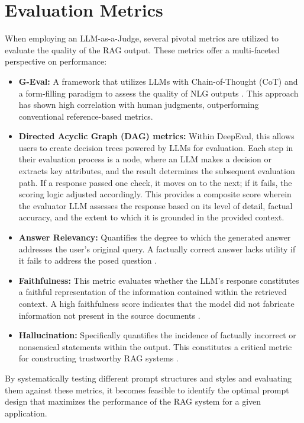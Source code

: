 \section{Evaluation Metrics}
When employing an LLM-as-a-Judge, several pivotal metrics are utilized to evaluate the quality of the RAG output. These metrics offer a multi-faceted perspective on performance:
\begin{itemize}
    \item \textbf{G-Eval:} A framework that utilizes LLMs with Chain-of-Thought (CoT) and a form-filling paradigm to assess the quality of NLG outputs \autocite{liu2023gevalnlgevaluationusing}. This approach has shown high correlation with human judgments, outperforming conventional reference-based metrics.
    \item \textbf{Directed Acyclic Graph (DAG) metrics:} Within DeepEval, this allows users to create decision trees powered by LLMs for evaluation. Each step in their evaluation process is a node, where an LLM makes a decision or extracts key attributes, and the result determines the subsequent evaluation path. If a response passed one check, it moves on to the next; if it fails, the scoring logic adjusted accordingly. This provides a composite score wherein the evaluator LLM assesses the response based on its level of detail, factual accuracy, and the extent to which it is grounded in the provided context.
    \item \textbf{Answer Relevancy:} Quantifies the degree to which the generated answer addresses the user's original query. A factually correct answer lacks utility if it fails to address the posed question \autocite{deepeval2023}.
    \item \textbf{Faithfulness:} This metric evaluates whether the LLM's response constitutes a faithful representation of the information contained within the retrieved context. A high faithfulness score indicates that the model did not fabricate information not present in the source documents \autocite{deepeval2023}.
    \item \textbf{Hallucination:} Specifically quantifies the incidence of factually incorrect or nonsensical statements within the output. This constitutes a critical metric for constructing trustworthy RAG systems \autocite{deepeval2023}.
\end{itemize}

By systematically testing different prompt structures and styles and evaluating them against these metrics, it becomes feasible to identify the optimal prompt design that maximizes the performance of the RAG system for a given application.